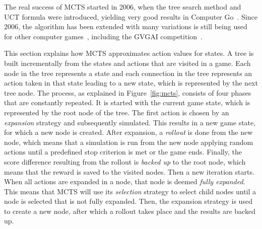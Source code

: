 \label{subsec:mcts}
The real success of MCTS started in 2006, when the tree search method and UCT
formula were introduced, yielding very good results in Computer
Go~\cite{gelly2006modification}. Since 2006, the algorithm has been extended
with many variations is still being used for other computer
games~\cite{browne2012survey}, including the GVGAI
competition~\cite{perez2014knowledge}.

This section explains how MCTS approximates action values for states.  A tree is
built incrementally from the states and actions that are visited in a game. Each
node in the tree represents a state and each connection in the tree represents
an action taken in that state leading to a new state, which is represented by
the next tree node.  The process, as explained in Figure~\ref{fig:mcts},
consists of four phases that are constantly repeated. It is started with the
current game state, which is represented by the root node of the tree. The first
action is chosen by an \emph{expansion} strategy and subsequently simulated.
This results in a new game state, for which a new node is created. After
expansion, a \emph{rollout} is done from the new node, which means that a
simulation is run from the new node applying random actions until a predefined
stop criterion is met or the game ends. Finally, the score difference resulting
from the rollout is \emph{backed up} to the root node, which means that the
reward is saved to the visited nodes.  Then a new iteration starts. When all
actions are expanded in a node, that node is deemed \emph{fully expanded}.
This means that MCTS will use its \emph{selection} strategy to select child
nodes until a node is selected that is not fully expanded.  Then, the expansion
strategy is used to create a new node, after which a rollout takes place and the
results are backed up.


